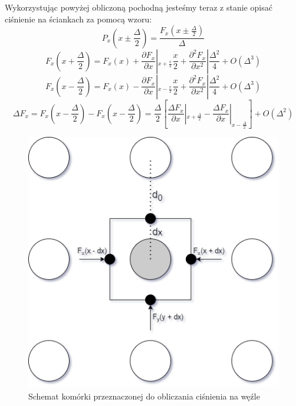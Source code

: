 \documentclass[12pt, letterpaper]{report}
\begin{document}
    Wykorzystując powyżej obliczoną pochodną jesteśmy teraz z stanie opisać ciśnienie na ściankach za pomocą wzoru:
    \begin{equation}
        P_x (x \pm \frac{\Delta}{2}) = \frac{F_x (x \pm \frac{\Delta}{2})}{\Delta}
    \end{equation}
    \begin{equation}
        F_x (x + \frac{\Delta}{2}) = F_x (x) + \frac{\partial F_x}{\partial x} 
        \left| _{x + \frac{x}{2}}  \frac{x}{2} + \frac{\partial^2 F_x}{\partial x^2 }  \right| \frac{\Delta^2}{4} + O(\Delta^3)
    \end{equation}
    \begin{equation}
        F_x (x - \frac{\Delta}{2}) = F_x (x) - \frac{\partial F_x}{\partial x} 
        \left| _{x - \frac{x}{2}}  \frac{x}{2} + \frac{\partial^2 F_x}{\partial x^2 }  \right| \frac{\Delta^2}{4} + O(\Delta^3)
    \end{equation} 
    \begin{equation}
        \Delta F_x = 
        F_x (x - \frac{\Delta}{2}) - F_x (x - \frac{\Delta}{2}) = 
        \frac{\Delta}{2} \left[ \frac{\Delta F_x}{\partial x} |_{x + \frac{\Delta}{2}}  -
          \frac{\Delta F_x}{\partial x}|_{x - \frac{\Delta}{2}} \right] + O(\Delta^2)
    \end{equation}

    \begin{figure}
        \includegraphics[width=0.9\linewidth]{pressure_box}
        \caption{Schemat komórki przeznaczonej do obliczania ciśnienia na węźle}
    \end{figure}
\end{document}
